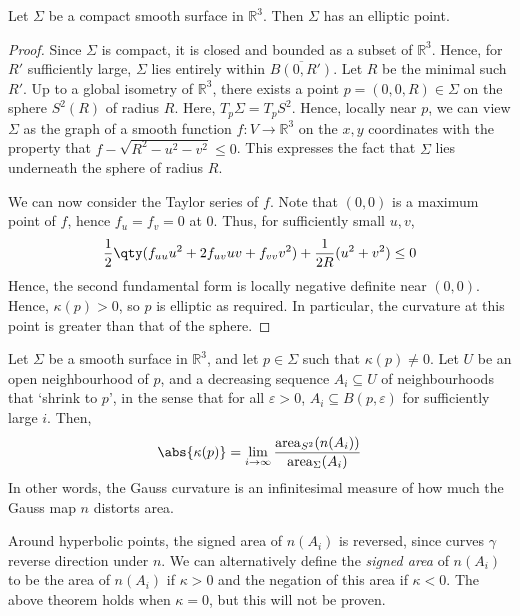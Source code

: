 \begin{proposition}
	Let $\Sigma$ be a compact smooth surface in $\mathbb R^3$.
	Then $\Sigma$ has an elliptic point.
\end{proposition}
\begin{proof}
	Since $\Sigma$ is compact, it is closed and bounded as a subset of $\mathbb R^3$.
	Hence, for $R'$ sufficiently large, $\Sigma$ lies entirely within $\overline{B(0,R')}$.
	Let $R$ be the minimal such $R'$.
	Up to a global isometry of $\mathbb R^3$, there exists a point $p = (0,0,R) \in \Sigma$ on the sphere $S^2(R)$ of radius $R$.
	Here, $T_p \Sigma = T_p S^2$.
	Hence, locally near $p$, we can view $\Sigma$ as the graph of a smooth function $f \colon V \to \mathbb R^3$ on the $x, y$ coordinates with the property that $f - \sqrt{R^2 - u^2 - v^2} \leq 0$.
	This expresses the fact that $\Sigma$ lies underneath the sphere of radius $R$.

	We can now consider the Taylor series of $f$.
	Note that $(0,0)$ is a maximum point of $f$, hence $f_u = f_v = 0$ at $0$.
	Thus, for sufficiently small $u,v$,
	\begin{align*}
		\frac{1}{2} \qty(f_{uu} u^2 + 2f_{uv} uv + f_{vv} v^2) + \frac{1}{2R} (u^2 + v^2) \leq 0
	\end{align*}
	Hence, the second fundamental form is locally negative definite near $(0,0)$.
	Hence, $\kappa(p) > 0$, so $p$ is elliptic as required.
	In particular, the curvature at this point is greater than that of the sphere.
\end{proof}
\begin{theorem}
	Let $\Sigma$ be a smooth surface in $\mathbb R^3$, and let $p \in \Sigma$ such that $\kappa(p) \neq 0$.
	Let $U$ be an open neighbourhood of $p$, and a decreasing sequence $A_i \subseteq U$ of neighbourhoods that `shrink to $p$', in the sense that for all $\varepsilon > 0$, $A_i \subseteq B(p,\varepsilon)$ for sufficiently large $i$.
	Then,
	\begin{align*}
		\abs{\kappa(p)} = \lim_{i \to \infty} \frac{\mathrm{area}_{S^2} (n(A_i))}{\mathrm{area}_{\Sigma} (A_i)}
	\end{align*}
	In other words, the Gauss curvature is an infinitesimal measure of how much the Gauss map $n$ distorts area.
\end{theorem}
\begin{remark}
	Around hyperbolic points, the signed area of $n(A_i)$ is reversed, since curves $\gamma$ reverse direction under $n$.
	We can alternatively define the \textit{signed area} of $n(A_i)$ to be the area of $n(A_i)$ if $\kappa > 0$ and the negation of this area if $\kappa < 0$.
	The above theorem holds when $\kappa = 0$, but this will not be proven.
\end{remark}
